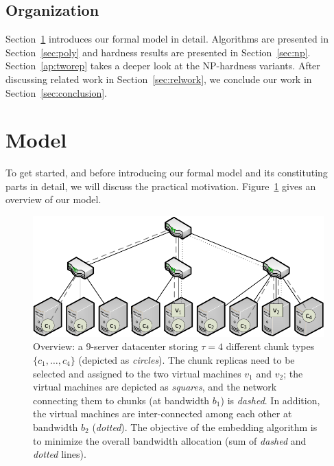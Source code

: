 \documentclass[preprint,12pt]{elsarticle}
\newcommand{\CostTrans}{\ensuremath{b_1}}
\newcommand{\CostCom}{\ensuremath{b_2}}
\begin{document}
\subsection{Organization}

Section~\ref{sec:model} introduces our formal model in detail.
Algorithms are presented in Section~\ref{sec:poly} and
hardness results are presented in Section~\ref{sec:np}.
Section~\ref{ap:tworep} takes a deeper look
at the NP-hardness variants.
After discussing related work in Section~\ref{sec:relwork},
we conclude our work in Section~\ref{sec:conclusion}.

\section{Model}\label{sec:model}

To get started, and before introducing our formal model and its constituting parts in detail,
we will discuss the practical motivation.
Figure~\ref{fig:overview} gives an overview of our model.

\begin{figure}[t]
\centering
\includegraphics[width=0.79\columnwidth]{figs/data_locality_no_legend.pdf}
\caption{Overview: a 9-server datacenter storing $\tau=4$ different chunk
types $\{c_1,\ldots,c_4\}$ (depicted as \emph{circles}). The chunk replicas need to be selected and assigned to the two
 virtual machines $v_1$ and $v_2$; the virtual machines are depicted as \emph{squares}, and
 the network connecting them to chunks (at bandwidth $\CostTrans$) is \emph{dashed}. In addition, the virtual machines are inter-connected among
 each other at bandwidth $\CostCom$ (\emph{dotted}). The objective of the embedding algorithm is to minimize the overall bandwidth allocation
 (sum of \emph{dashed} and \emph{dotted} lines).}\label{fig:overview}
\vspace{-1em}
\end{figure}
\end{document}
